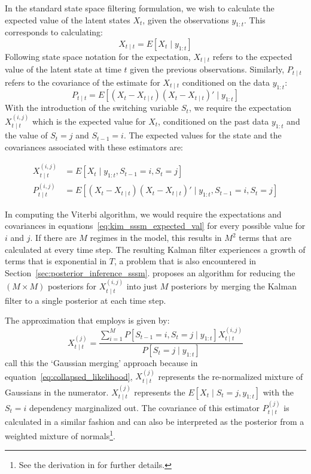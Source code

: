 In the standard state space filtering formulation, we wish to calculate the expected value of the latent states $X_t$, given the observations $y_{1:t}$. This corresponds to calculating:
\begin{equation}\label{eq:kim_ssm_expected_val}
  X_{t \mid t} = E[X_t \mid y_{1:t}]
\end{equation}
Following state space notation for the expectation, $X_{t \mid t}$ refers to the expected value of the latent state at time $t$ given the previous observations. Similarly, $P_{t \mid t}$ refers to the covariance of the estimate for $X_{t \mid t}$ conditioned on the data $y_{1:t}$:
\begin{equation}\label{eq:kim_ssm_covariance}
  P_{t \mid t} = E[(X_t - X_{t \mid t})(X_t - X_{t \mid t})' \mid y_{1:t}]
\end{equation}
With the introduction of the switching variable $S_t$, we require the expectation $X_{t \mid t}^{(i,j)}$ which is the expected value for $X_t$, conditioned on the past data $y_{1:t}$ and the value of $S_t = j$ and $S_{t-1} = i$. The expected values for the state and the covariances associated with these estimators are:

\begin{equation}\label{eq:kim_sssm_expected_val}
	\begin{split}
  X_{t \mid t}^{(i,j)} &= E[X_t \mid y_{1:t}, S_{t-1} = i, S_t = j] \\
  P_{t \mid t}^{(i,j)} &= E[(X_t - X_{t \mid t})(X_t - X_{t \mid t})' \mid y_{1:t}, S_{t-1} = i, S_t = j]
  	\end{split}
\end{equation}

In computing the Viterbi algorithm, we would require the expectations and covariances in equations~\ref{eq:kim_sssm_expected_val} for every possible value for $i$ and $j$. If there are $M$ regimes in the model, this results in $M^2$ terms that are calculated at every time step. The resulting Kalman filter experiences a growth of terms that is exponential in $T$, a problem that is also encountered in Section~\ref{sec:posterior_inference_sssm}. \cite{kim1994dynamic} proposes an algorithm for reducing the $(M \times M)$ posteriors for $X_{t \mid t}^{(i,j)}$ into just $M$ posteriors by merging the Kalman filter to a single posterior at each time step.

The approximation that \cite{kim1994dynamic} employs is given by:
\begin{equation}\label{eq:collapsed_likelihood}
  X_{t \mid t}^{(j)} = \frac{\sum\limits_{i=1}^{M} P[S_{t-1}=i, S_t=j \mid y_{1:t}]X_{t \mid t}^{(i,j)}}{P[S_t = j \mid y_{1:t}]}
\end{equation}
\cite{ghahramani2000variational} call this the `Gaussian merging' approach because in equation~\ref{eq:collapsed_likelihood}, $X_{t \mid t}^{(j)}$ represents the re-normalized mixture of Gaussians in the numerator. $X_{t \mid t}^{(j)}$ represents the $E[X_t \mid S_t = j, y_{1:t}]$ with the $S_t = i$ dependency marginalized out. The covariance of this estimator $P_{t \mid t}^{(j)}$ is calculated in a similar fashion and can also be interpreted as the posterior from a weighted mixture of normals\footnote{See the derivation in \cite{kim1994dynamic} for further details.}.

